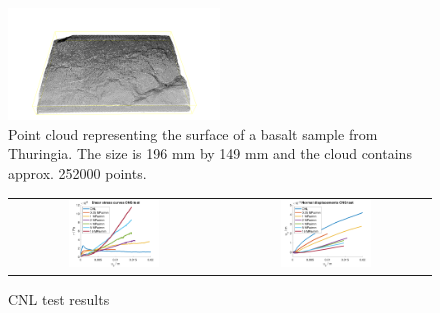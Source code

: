 \begin{figure}[!ht]
\begin{center}
\includegraphics[width=0.5\textwidth]{./figures/MEX3-2PointCloud.png}
\end{center}
\caption{Point cloud representing the surface of a basalt sample from Thuringia. The size is 196 mm by 149 mm and the cloud contains approx. 252000 points.}
\label{fig:DataCNSBasaltPointCloud}
\end{figure}

\begin{figure}[!ht]
\begin{tabular}{cc}
\includegraphics[width=0.45\textwidth]{./figures/CNSShearCurvesAll.png}     
& 
\includegraphics[width=0.45\textwidth]{./figures/CNSDilatationAll.png} 
\end{tabular}
\caption{CNL test results}
\label{fig:DataCNSBasaltLab}
\end{figure}


